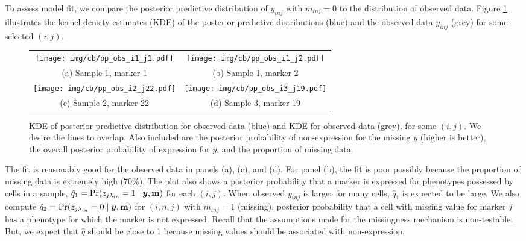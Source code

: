 \documentclass[12pt,]{article}
\def\Prob{\text{Pr}}
\newcommand{\by}{\mbox{\boldmath $y$}}
\begin{document}
To assess model fit, we compare the posterior predictive distribution of
$y_{inj}$ with $m_{inj}=0$ to the distribution of observed data. Figure
\ref{fig:cb-pp-obs-some} illustrates the kernel density estimates (KDE) of the
posterior predictive distributions (blue) and the observed data $y_{inj}$
(grey) for some selected $(i,j)$.
\begin{figure}%
\begin{center}
  \begin{tabular}{cc}
  \texttt{[image: img/cb/pp\_obs\_i1\_j1.pdf]}&
  \texttt{[image: img/cb/pp\_obs\_i1\_j2.pdf]}\\
  {\small (a) Sample 1, marker 1} & {\small (b) Sample 1, marker 2} \\
  \texttt{[image: img/cb/pp\_obs\_i2\_j22.pdf]}&
  \texttt{[image: img/cb/pp\_obs\_i3\_j19.pdf]}\\
  {\small (c) Sample 2, marker 22} & {\small (d) Sample 3, marker 19} \\
  \end{tabular}
\end{center}
\vspace{-0.05in}
\caption{KDE of posterior predictive distribution for observed data (blue) and
  KDE for observed data (grey), for some $(i,j)$. We desire the lines to
  overlap.  Also included are the posterior probability of non-expression for
  the missing $y$ (higher is better), the overall posterior probability of
  expression for $y$, and the proportion of missing data.}
\label{fig:cb-pp-obs-some}
\end{figure}
The fit is reasonably good for the observed data in panels (a), (c), and (d).
For panel (b), the fit is poor possibly because the proportion of missing data
is extremely high (70\%).  The plot also shows a posterior probability that a
marker is expressed for phenotypes possessed by cells in a sample,
$\hat{q}_1=\Prob(z_{j \lambda_{in}}=1 \mid \by, \bf m)$ for each $(i,j)$. When
observed $y_{inj}$ is larger for many cells, $\hat{q}_1$ is expected to be
large.  We also compute $\hat{q}_2=\Prob(z_{j \lambda_{in}}=0 \mid \by, \bf m)$
for $(i,n,j)$ with $m_{inj}=1$ (missing), posterior probability that a cell
with missing value for marker $j$ has a phenotype for which the marker is not
expressed. Recall that the assumptions made for the missingness mechanism is
non-testable. But, we expect that $\hat{q}$ should be close to 1 because
missing values should be associated with non-expression.
\end{document}
